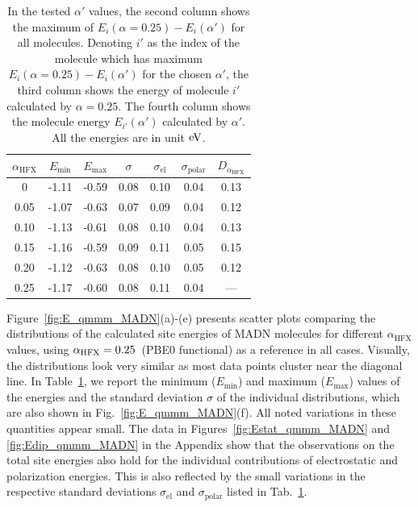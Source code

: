 \documentclass[%
 reprint,
superscriptaddress,
 amsmath,amssymb,
 aps,
prb,
floatfix
]{revtex4-2}
\newcommand{\bjoern}[2]{{\color{blue}{{\bf #1} #2}}}
\newcommand{\ahfx}{\ensuremath{\alpha_\text{HFX}}\xspace}
\begin{document}
\begin{table}[tbp]
  \caption{\bjoern{TODO: }{rewrite caption}In the tested $\alpha'$ values, the second column shows the maximum of $E_i(\alpha=0.25) - E_i(\alpha')$ for all molecules. Denoting $i'$ as the index of the molecule which has maximum $E_i(\alpha=0.25) - E_i(\alpha')$ for the chosen $\alpha'$, the third column shows the energy of molecule $i'$ calculated by $\alpha=0.25$. The fourth column shows the molecule energy $E_{i'}(\alpha')$ calculated by $\alpha'$. All the energies are in unit $\unit[]{eV}$.}
  \begin{ruledtabular}
    \begin{tabular}{c c c c c c c}
    $\ahfx$ & $E_\text{min}$ & $E_\text{max}$ & $\sigma$ & $\sigma_\text{el}$ & $\sigma_\text{polar}$ &  $D_{\ahfx}$ \\%
    \hline
    0    & -1.11 & -0.59 & 0.08 & 0.10 & 0.04 & 0.13 \\ %
    0.05 & -1.07 & -0.63 & 0.07 & 0.09 & 0.04 & 0.12 \\ %
    0.10 & -1.13 & -0.61 & 0.08 & 0.10 & 0.04 & 0.13 \\ %
    0.15 & -1.16 & -0.59 & 0.09 & 0.11 & 0.05 & 0.15 \\ %
    0.20 & -1.12 & -0.63 & 0.08 & 0.10 & 0.05 & 0.12 \\ %
    0.25 & -1.17 & -0.60 & 0.08 & 0.11 & 0.04 & ---  \\ %
    \end{tabular}
  \end{ruledtabular}
  \label{tab:maxEi}
\end{table}

Figure~\ref{fig:E_qmmm_MADN}(a)-(e) presents scatter plots comparing the distributions of the calculated site energies of MADN molecules for different \ahfx values, using $\ahfx = \unit[0.25]{}$ (PBE0 functional) as a reference in all cases. Visually, the distributions look very similar as most data points cluster near the diagonal line. In Table~\ref{tab:maxEi}, we report the minimum ($E_\text{min}$) and maximum ($E_\text{max}$) values of the energies and the standard deviation $\sigma$ of the individual distributions, which are also shown in Fig.~\ref{fig:E_qmmm_MADN}(f). All noted variations in these quantities appear small. The data in Figures~\ref{fig:Estat_qmmm_MADN} and \ref{fig:Edip_qmmm_MADN} in the Appendix show that the observations on the total site energies also hold for the individual contributions of electrostatic and polarization energies. This is also reflected by the small variations in the respective standard deviations $\sigma_\text{el}$ and $\sigma_\text{polar}$ listed in Tab.~\ref{tab:maxEi}.
\end{document}
